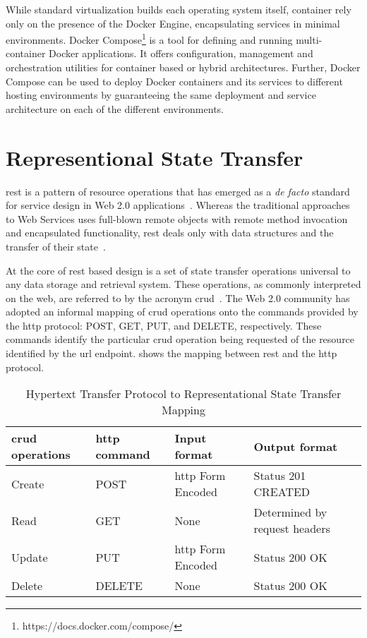 \documentclass[
a4paper,
twoside,
headsepline,
cleardoublepage=empty,
parskip=half,
draft=false
]{scrbook}
\begin{document}
			While standard virtualization builds each operating system itself, container rely only on the presence of the Docker Engine, encapsulating services in minimal environments.
			Docker Compose\footnote{https://docs.docker.com/compose/} is a tool for defining and running multi-container Docker applications. It offers configuration, management and orchestration utilities for container based or hybrid architectures. Further, Docker Compose can be used to deploy Docker containers and its services to different hosting environments by guaranteeing the same deployment and service architecture on each of the different environments.

		\section{Representional State Transfer}\label{sec:rest}

			\gls{rest} is a pattern of resource operations that has emerged as a \textit{de facto} standard for service design in Web 2.0 applications~\cite{battle2008bridging}. Whereas the traditional approaches to Web Services uses full-blown remote objects with remote method invocation and encapsulated functionality, \gls{rest} deals only with data structures and the transfer of their state~\cite{fielding2000architectural}.
			
			At the core of \gls{rest} based design is a set of state transfer operations universal to any data storage and retrieval system.
			These operations, as commonly interpreted on the web, are referred to by the acronym \gls{crud}~\cite{battle2008bridging}.
			The Web 2.0 community has adopted an informal mapping of \gls{crud} operations onto the commands provided by the \gls{http} protocol: POST, GET, PUT, and DELETE, respectively. 
			These commands identify the particular \gls{crud} operation being requested of the resource identified by the \gls{url} endpoint.
			 shows the mapping between \gls{rest} and the \gls{http} protocol.
			
			\begin{table}[!h]
				\centering
				\caption{Hypertext Transfer Protocol to Representational State Transfer Mapping}
				\label{tab:http_rest_mapping}
				\begin{tabular}{@{}llll@{}}
					\toprule
					\gls{crud} operations & \gls{http} command & Input format & Output format
					\\ \midrule
					Create & POST & \gls{http} Form Encoded & Status 201 CREATED
					\\ \midrule
					Read & GET & None & Determined by request headers 
					\\ \midrule
					Update & PUT & \gls{http} Form Encoded & Status 200 OK
					\\ \midrule
					Delete & DELETE & None & Status 200 OK
					\\ \bottomrule
				\end{tabular}
			\end{table}
		
\end{document}
